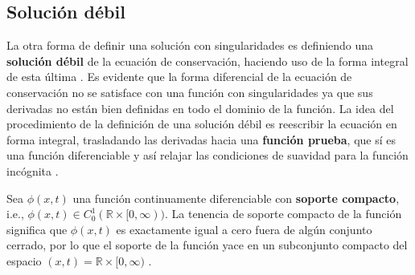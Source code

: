 \subsection{Solución débil}
La otra forma de definir una solución con singularidades es definiendo una \textbf{solución débil} de la ecuación de conservación, haciendo uso de la forma integral de esta última \cite{Leveque}. Es evidente que la forma diferencial de la ecuación de conservación no se satisface con una función con singularidades ya que sus derivadas no están bien definidas en todo el dominio de la función. La idea del procedimiento de la definición de una solución débil es reescribir la ecuación en forma integral, trasladando las derivadas hacia una \textbf{función prueba}, que sí es una función diferenciable y así relajar las condiciones de suavidad para la función incógnita \cite{Leveque}.

Sea $\phi(x,t)$ una función continuamente diferenciable con \textbf{soporte compacto}, i.e., $\phi(x,t) \in C_{0}^{1} (\mathbb{R} \times [0, \infty))$. La tenencia de soporte compacto de la función significa que $\phi(x,t)$ es exactamente igual a cero fuera de algún conjunto cerrado, por lo que el soporte de la función yace en un subconjunto compacto del espacio $(x,t) = \mathbb{R} \times [0, \infty)$ \cite{Cameron}\cite{Leveque}.

